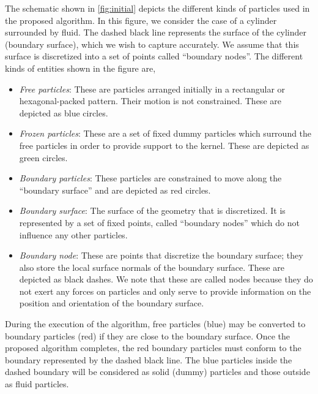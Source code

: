 \documentclass[preprint,12pt]{elsarticle}
\begin{document}
The schematic shown in \cref{fig:initial} depicts the different kinds of
particles used in the proposed algorithm. In this figure, we consider the case
of a cylinder surrounded by fluid. The dashed black line represents the
surface of the cylinder (boundary surface), which we wish to capture
accurately. We assume that this surface is discretized into a set of points
called ``boundary nodes''. The different kinds of entities shown in the figure
are,
\begin{itemize}
\item \emph{Free particles}: These are particles arranged initially in a
  rectangular or hexagonal-packed pattern. Their motion is not constrained.
  These are depicted as blue circles.
\item \emph{Frozen particles}: These are a set of fixed dummy particles which
  surround the free particles in order to provide support to the kernel. These
  are depicted as green circles.
\item \emph{Boundary particles}: These particles are constrained to move along
  the ``boundary surface'' and are depicted as red circles.
\item \emph{Boundary surface}: The surface of the geometry that is
  discretized. It is represented by a set of fixed points, called ``boundary
  nodes'' which do not influence any other particles.
\item \emph{Boundary node}: These are points that discretize the boundary
  surface; they also store the local surface normals of the boundary surface.
  These are depicted as black dashes. We note that these are called nodes
  because they do not exert any forces on particles and only serve to provide
  information on the position and orientation of the boundary surface.
\end{itemize}
During the execution of the algorithm, free particles (blue) may be converted
to boundary particles (red) if they are close to the boundary surface. Once
the proposed algorithm completes, the red boundary particles must conform to
the boundary represented by the dashed black line. The blue particles inside
the dashed boundary will be considered as solid (dummy) particles and those
outside as fluid particles.
\end{document}
